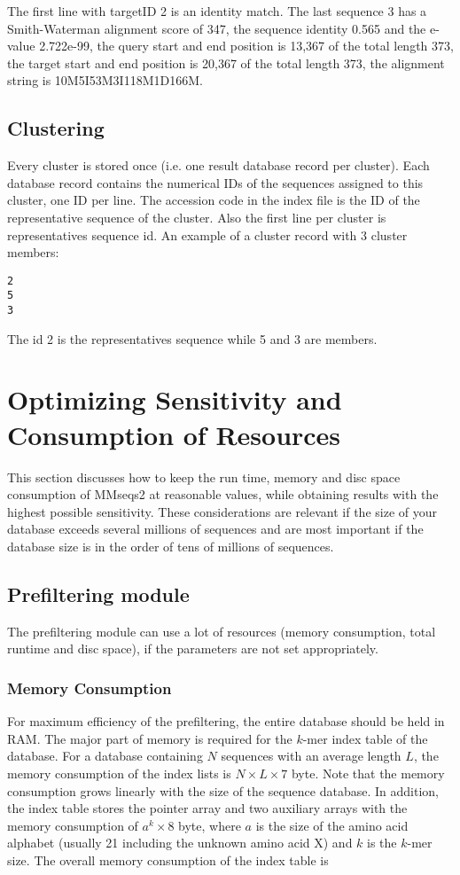 \documentclass[11pt,a4paper]{scrreprt}
\begin{document}
The first line with targetID 2 is an identity match. The last sequence 3 has a Smith-Waterman alignment score of 347, the sequence identity 0.565 and the e-value 2.722e-99, the query start and end position is 13,367 of the total length 373, the target start and end position is 20,367 of the total length 373, the alignment string is 10M5I53M3I118M1D166M.

\subsection{Clustering}
Every cluster is stored once (i.e. one result database record per cluster). Each database record contains the numerical IDs of the sequences assigned to this cluster, one ID per line. The accession code in the index file is the ID of the representative sequence of the cluster. Also the first line per cluster is representatives sequence id.  An example of a cluster record with 3 cluster members:

\begin{verbatim}
2
5
3
\end{verbatim}

The id 2 is the representatives sequence while 5 and 3 are members. 

\section{Optimizing Sensitivity and Consumption of Resources} \label{sec:Sensitivity-and-consumption}
This section discusses how to keep the run time, memory and disc space consumption of MMseqs2 at reasonable values, while obtaining results with the highest possible sensitivity. These considerations are relevant if the size of your database exceeds several millions of sequences and are most important if the database size is in the order of tens of millions of sequences.
\subsection{Prefiltering module}
The prefiltering module can use a lot of resources (memory consumption, total runtime and disc space), if the parameters are not set appropriately.
\subsubsection{Memory Consumption}
For maximum efficiency of the prefiltering, the entire database should be held in RAM. The major part of memory is required for the $k$-mer index table of the database. For a database containing $N$ sequences with an average length $L$, the memory consumption of the index lists is $N\times L\times7$ byte. Note that the memory consumption grows linearly with the size of the sequence database. In addition, the index table stores the pointer array and two auxiliary arrays with the memory consumption of $a^{k}\times8$ byte, where $a$ is the size of the amino acid alphabet (usually 21 including the unknown amino acid X) and $k$ is the $k$-mer size. The overall memory consumption of the index table is
\end{document}
